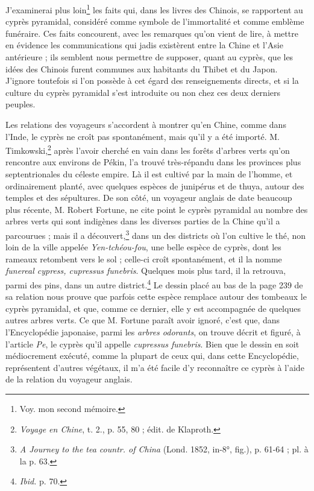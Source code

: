 \documentclass{article}
\begin{document}
J'examinerai plus loin\footnote{Voy. mon second mémoire.} les faits qui, dans les livres des Chinois, se rapportent au cyprès pyramidal, considéré comme symbole de l'immortalité et comme emblème funéraire. Ces faits concourent, avec les remarques qu'on vient de lire, à mettre en évidence les communications qui jadis existèrent entre la Chine et l'Asie antérieure ; ils semblent nous permettre de supposer, quant au cyprès, que les idées des Chinois furent communes aux habitants du Thibet et du Japon. J'ignore toutefois si l'on possède à cet égard des renseignements directs, et si la culture du cyprès pyramidal s'est introduite ou non chez ces deux derniers peuples.

Les relations des voyageurs s'accordent à montrer qu'en Chine, comme dans l'Inde, le cyprès ne croît pas spontanément, mais qu'il y a été importé. M. Timkowski,\footnote{\emph{Voyage en Chine}, t. 2., p. 55, 80 ; édit. de Klaproth.} après l'avoir cherché en vain dans les forêts d'arbres verts qu'on rencontre aux environs de Pékin, l'a trouvé très-répandu dans les provinces plus septentrionales du céleste empire. Là il est cultivé par la main de l'homme, et ordinairement planté, avec quelques espèces de junipérus et de thuya, autour des temples et des sépultures. De son côté, un voyageur anglais de date beaucoup plus récente, M. Robert Fortune, ne cite point le cyprès pyramidal au nombre des arbres verts qui sont indigènes dans les diverses parties de la Chine qu'il a parcourues ; mais il a découvert,\footnote{\emph{A Journey to the tea countr. of China} (Lond. 1852, in-8°, fig.), p. 61-64 ; pl. à la p. 63.} dans un des districts où l'on cultive le thé, non loin de la ville appelée \emph{Yen-tchéou-fou}, une belle espèce de cyprès, dont les rameaux retombent vers le sol ; celle-ci croît spontanément, et il la nomme \emph{funereal cypress, cupressus funebris}. Quelques mois plus tard, il la retrouva, parmi des pins, dans un autre district.\footnote{\emph{Ibid.} p. 70.} Le dessin placé au bas de la page 239 de sa relation nous prouve que parfois cette espèce remplace autour des tombeaux le cyprès pyramidal, et que, comme ce dernier, elle y est accompagnée de quelques autres arbres verts. Ce que M. Fortune paraît avoir ignoré, c'est que, dans l'Encyclopédie japonaise, parmi les \emph{arbres odorants}, on trouve décrit et figuré, à l'article \emph{Pe}, le cyprès qu'il appelle \emph{cupressus funebris}. Bien que le dessin en soit médiocrement exécuté, comme la plupart de ceux qui, dans cette Encyclopédie, représentent d'autres végétaux, il m'a été facile d'y reconnaître ce cyprès à l'aide de la relation du voyageur anglais.
\end{document}
